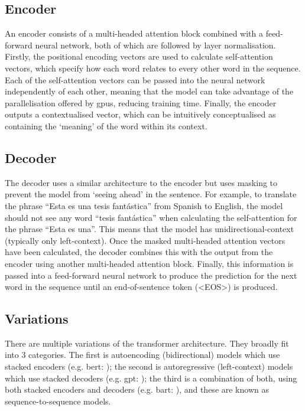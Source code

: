 \subsection{Encoder}\label{sec:transformers_encoder}
An encoder consists of a multi-headed attention block combined with a feed-forward neural network, both of which are followed by layer normalisation. Firstly, the positional encoding vectors are used to calculate self-attention vectors, which specify how each word relates to every other word in the sequence. Each of the self-attention vectors can be passed into the neural network independently of each other, meaning that the model can take advantage of the parallelisation offered by \acrshort{gpu}s, reducing training time. Finally, the encoder outputs a contextualised vector, which can be intuitively conceptualised as containing the `meaning' of the word within its context.

\subsection{Decoder}
The decoder uses a similar architecture to the encoder but uses masking to prevent the model from `seeing ahead' in the sentence. For example, to translate the phrase ``Esta es una tesis fantástica'' from Spanish to English, the model should not see any word ``tesis fantástica'' when calculating the self-attention for the phrase ``Esta es una''. This means that the model has unidirectional-context (typically only left-context). Once the masked multi-headed attention vectors have been calculated, the decoder combines this with the output from the encoder using another multi-headed attention block. Finally, this information is passed into a feed-forward neural network to produce the prediction for the next word in the sequence until an end-of-sentence token (<EOS>) is produced.

\subsection{Variations}
There are multiple variations of the transformer architecture.
They broadly fit into 3 categories. The first is autoencoding (bidirectional) models which use stacked encoders (e.g. \acrshort{bert}: \citet{devlin2019bert}); the second is autoregressive (left-context) models which use stacked decoders (e.g. \acrshort{gpt}: \citet{radford2018improving}); the third is a combination of both, using both stacked encoders and decoders (e.g. \acrshort{bart}: \citet{lewis2019bart}), and these are known as sequence-to-sequence models. 

